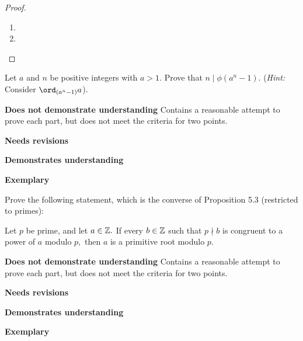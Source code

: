 \documentclass[letterpaper, 11pt]{../ximera}
\begin{document}
\begin{proof}
 	\begin{enumerate}[label=(\alph*)]
 		\item 
		\item 
	\end{enumerate}
\end{proof}

\begin{ex} 
	Let $a$ and $n$ be positive integers with $a>1$. Prove that $n\mid \phi(a^n-1)$. (\emph{Hint:} Consider $\ord_{(a^n-1)} a$). 
\end{ex}

\begin{writeRubric}
    \item \textbf{Does not demonstrate understanding}
     Contains a reasonable attempt to prove each part, but does not meet the criteria for two points.
    \item \textbf{Needs revisions}
     
    \item \textbf{Demonstrates understanding}
    
    \item \textbf{Exemplary}
        
\end{writeRubric}
                                       
	
\begin{solution}
 
\end{solution}

\begin{ex}
    Prove the following statement, which is the converse of Proposition 5.3 (restricted to primes): 
	\begin{prop*}
 	    Let $p$ be prime, and let $a\in\mathbb Z.$ If every $b\in\mathbb Z$ such that $p\nmid b$ is congruent to a power of $a$ modulo $p,$ then ${a}$ is a primitive root modulo $p$.

	\end{prop*}
\end{ex}

\begin{writeRubric}
    \item \textbf{Does not demonstrate understanding}
     Contains a reasonable attempt to prove each part, but does not meet the criteria for two points.
    \item \textbf{Needs revisions}
     
    \item \textbf{Demonstrates understanding}
    
    \item \textbf{Exemplary}
        
\end{writeRubric}
                                       
\end{document}

